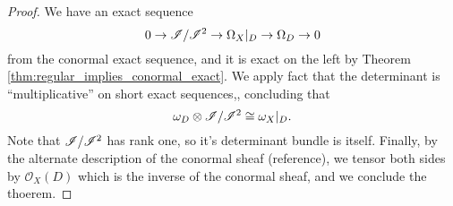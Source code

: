 \begin{proof}
  We have an exact sequence
  \[
    0 \to \mathscr{I} / \mathscr{I}^{2} \to 
    \Omega_X|_D \to \Omega_D \to 0
  \]
  from the conormal exact sequence, and
  it is exact on the left by 
  Theorem \ref{thm:regular_implies_conormal_exact}.
  We apply fact that the determinant is
  ``multiplicative'' on short exact sequences,,
  concluding that 
  \[
     \omega_D \otimes \mathscr{I} / \mathscr{I}^{2} 
     \cong \omega_X|_D
   .\]
   Note that $\mathscr{I} / \mathscr{I}^{2}$ has rank one, so it's 
   determinant bundle is itself.
   Finally,
   by the alternate description of the conormal
   sheaf (reference),
   we tensor both sides by 
   $\mathcal{O}_X(D)$ which is the inverse
   of the conormal sheaf, and we conclude the 
   thoerem.

\end{proof}


